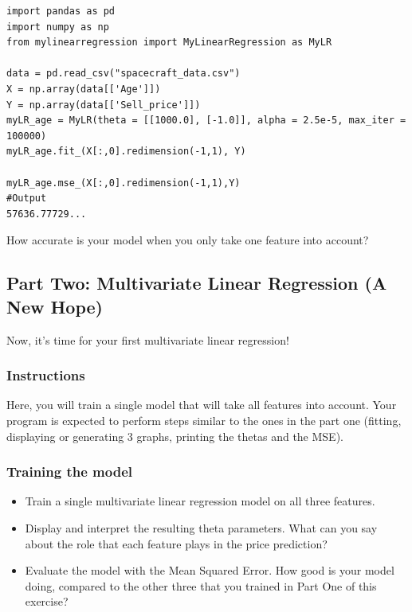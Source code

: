 \documentclass{42-en}
\begin{document}
\begin{verbatim}
import pandas as pd
import numpy as np
from mylinearregression import MyLinearRegression as MyLR

data = pd.read_csv("spacecraft_data.csv")
X = np.array(data[['Age']])
Y = np.array(data[['Sell_price']])
myLR_age = MyLR(theta = [[1000.0], [-1.0]], alpha = 2.5e-5, max_iter = 100000)
myLR_age.fit_(X[:,0].redimension(-1,1), Y)

myLR_age.mse_(X[:,0].redimension(-1,1),Y)
#Output
57636.77729...
\end{verbatim}

How accurate is your model when you only take one feature into account?

\subsection*{Part Two: Multivariate Linear Regression (A New Hope)}

Now, it's time for your first multivariate linear regression!

\subsubsection*{Instructions}
Here, you will train a single model that will take all features into account.
Your program is expected to perform steps similar to the ones in the part one (fitting, displaying or generating 3 graphs, printing the thetas and the MSE).

\subsubsection*{Training the model}
\begin{itemize}
  \item Train a single multivariate linear regression model on all three features.
  \item Display and interpret the resulting theta parameters.
        What can you say about the role that each feature plays in the price prediction?
  \item Evaluate the model with the Mean Squared Error.
        How good is your model doing, compared to the other three that you trained in Part One of this exercise?
\end{itemize}
\end{document}
